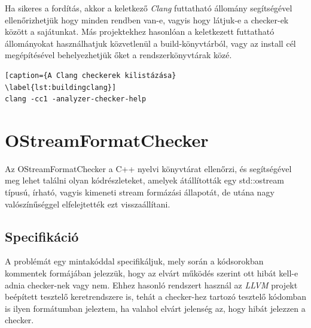 \documentclass[a4paper,12pt]{report}
\begin{document}
Ha sikeres a fordítás, akkor a keletkező \emph{Clang} futtatható állomány segítségével ellenőrizhetjük hogy minden rendben van-e, vagyis hogy látjuk-e a checker-ek között a sajátunkat. Más projektekhez hasonlóan a keletkezett futtatható állományokat használhatjuk közvetlenül a build-könyvtárból, vagy az install cél megépítésével behelyezhetjük őket a rendszerkönyvtárak közé.

\begin{lstlisting}[caption={A Clang checkerek kilistázása}
\label{lst:buildingclang}]
clang -cc1 -analyzer-checker-help
\end{lstlisting}

\section{OStreamFormatChecker}
Az OStreamFormatChecker a C++ nyelvi könyvtárat ellenőrzi, és segítségével meg lehet találni olyan kódrészleteket, amelyek átállították egy std::ostream típusú, írható, vagyis kimeneti stream formázási állapotát, de utána nagy valószínűséggel elfelejtették ezt visszaállítani.

\subsection{Specifikáció}
A problémát egy mintakóddal specifikáljuk, mely során a kódsorokban kommentek formájában jelezzük, hogy az elvárt működés szerint ott hibát kell-e adnia checker-nek vagy nem. Ehhez hasonló rendszert használ az \emph{LLVM} projekt beépített tesztelő keretrendszere is, tehát a checker-hez tartozó tesztelő kódomban is ilyen formátumban jeleztem, ha valahol elvárt jelenség az, hogy hibát jelezzen a checker.
\end{document}

